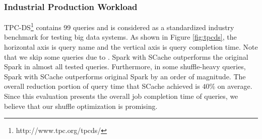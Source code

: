 
\subsubsection{Industrial Production Workload}
TPC-DS\footnote{http://www.tpc.org/tpcds/} contains 99 queries and is considered as a standardized industry benchmark for testing big data systems. 
As shown in Figure \ref{fig:tpcds}, the horizontal axis is query name and the vertical axis is query completion time. 
Note that we skip some queries due to . 
Spark with SCache outperforms the original Spark in almost all tested queries. 
Furthermore, in some shuffle-heavy queries, Spark with SCache outperforms original Spark by an order of magnitude. 
The overall reduction portion of query time that SCache achieved is $40\%$ on average. 
Since this evaluation presents the overall job completion time of queries, we believe that our shuffle optimization is promising.


